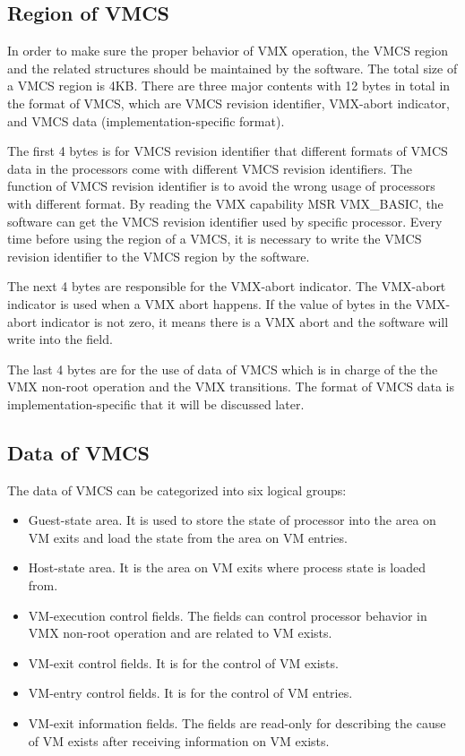 \documentclass[10pt,draftclsnofoot,journal,compsoc,onecolumn]{IEEEtran}
\begin{document}
\subsection{Region of VMCS}
	\par In order to make sure the proper behavior of VMX operation, the VMCS region and the related structures should be maintained by the software.  The total size of a VMCS region is 4KB. There are three major contents with 12 bytes in total in the format of VMCS, which are VMCS revision identifier, VMX-abort indicator, and VMCS data (implementation-specific format).
    \par The first 4 bytes is for VMCS revision identifier that different formats of VMCS data in the processors come with different VMCS revision identifiers. The function of VMCS revision identifier is to avoid the wrong usage of processors with different format. By reading the VMX capability MSR VMX\_BASIC, the software can get the VMCS revision identifier used by specific processor. Every time before using the region of a VMCS, it is necessary to write the VMCS revision identifier to the VMCS region by the software.
    \par The next 4 bytes are responsible for the VMX-abort indicator. The VMX-abort indicator is used when a VMX abort happens. If the value of bytes in the VMX-abort indicator is not zero, it means there is a VMX abort and the software will write into the field.
    \par The last 4 bytes are for the use of data of VMCS which is in charge of the the VMX non-root operation and the VMX transitions. The format of VMCS data is implementation-specific that it will be discussed later.

\subsection{Data of VMCS}
The data of VMCS can be categorized into six logical groups:
\begin{itemize}
  \item Guest-state area. It is used to store the state of processor into the area on VM exits and load the state from the area on VM entries.  
  \item Host-state area. It is the area on VM exits where process state is loaded from.
  \item VM-execution control fields. The fields can control processor behavior in VMX non-root operation and are related to VM exists.
  \item VM-exit control fields. It is for the control of VM exists.
  \item VM-entry control fields. It is for the control of VM entries.
  \item VM-exit information fields. The fields are read-only for describing the cause of VM exists after receiving information on VM exists.
\end{itemize}
\end{document}
